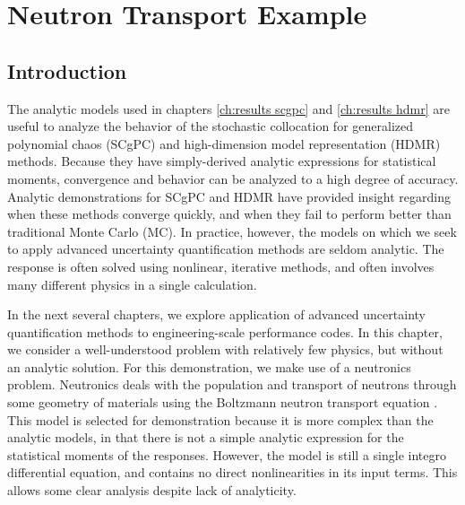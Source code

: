 
\chapter{Neutron Transport Example} %

\label{ch:c5g7} %



\section{Introduction}
The analytic models used in chapters \ref{ch:results scgpc} and \ref{ch:results hdmr} are useful to
analyze the behavior of the stochastic collocation for generalized polynomial chaos (SCgPC) and high-dimension model
representation (HDMR)  methods.  Because they have simply-derived analytic expressions for statistical moments, convergence
and behavior can be analyzed to a high degree of accuracy.  Analytic demonstrations for SCgPC and HDMR have
provided insight regarding when these methods converge quickly, and when they fail to perform better than
traditional Monte Carlo (MC). In practice, however, the models on which we seek to apply
advanced uncertainty quantification methods are seldom analytic.  The response is often solved using nonlinear,
iterative methods, and often involves many different physics in a single calculation.

In the next several chapters, we explore application of advanced uncertainty quantification methods to
engineering-scale performance codes.  In this chapter, we consider a well-understood problem with
relatively few physics, but without an analytic solution.  For this demonstration, we make use of a neutronics
problem.  Neutronics deals with the population and transport of neutrons through some geometry of materials
using the Boltzmann neutron transport equation \cite{lewistrans}. This model is selected for demonstration
because it is more complex than the analytic models, in that there is not a simple analytic expression for the
statistical moments of the responses.  However, the model is still a single integro differential equation, and
contains no direct nonlinearities in its input terms.  This allows some clear analysis despite lack of
analyticity.


